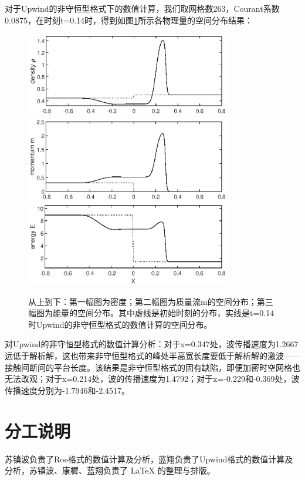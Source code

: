 \documentclass{article}
\begin{document}
对于Upwind的非守恒型格式下的数值计算，我们取网格数263，Courant系数0.0875，在时刻t=0.14时，得到如图\ref{fig:upwind2}所示各物理量的空间分布结果：
\begin{figure}[H]
\centering
\includegraphics[width=0.8\textwidth]{Upwind_non_con_d.eps}
\includegraphics[width=0.8\textwidth]{Upwind_non_con_m.eps}
\includegraphics[width=0.8\textwidth]{Upwind_non_con_e.eps}
\caption{从上到下：第一幅图为密度；第二幅图为质量流m的空间分布；第三幅图为能量的空间分布。其中虚线是初始时刻的分布，实线是t=0.14时Upwind的非守恒型格式的数值计算的空间分布。}
\label{fig:upwind2}
\end{figure}
对Upwind的非守恒型格式的数值计算分析：对于x=0.347处，波传播速度为1.2667远低于解析解，这也带来非守恒型格式的峰处半高宽长度要低于解析解的激波——接触间断间的平台长度。该结果是非守恒型格式的固有缺陷，即便加密时空网格也无法改观；对于x=0.214处，波的传播速度为1.4792；对于x=-0.229和-0.369处，波传播速度分别为-1.7946和-2.4517。
\section{分工说明}
苏镇波负责了Roe格式的数值计算及分析，蓝翔负责了Upwind格式的数值计算及分析，苏镇波、康樨、蓝翔负责了 \LaTeX\xspace 的整理与排版。
\end{document}
